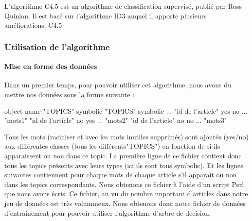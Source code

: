 L’algorithme C4.5 est un algorithme de classification supervisé, publié par Ross Quinlan. Il est basé sur l'algorithme ID3 auquel il apporte plusieurs améliorations.
C4.5




\subsubsection{Utilisation de l'algorithme}
\paragraph{Mise en forme des données}  
Dans un premier temps, pour pouvoir utiliser cet algorithme, nous avons du mettre nos données sous la forme suivante :

object name "TOPICS" symbolic "TOPICS" symbolic ... 
"id de l'article" yes no ... "mots1"
"id de l'article" no yes ... "mots2"
"id de l'article" no no ... "mots3"

Tous les mots (raciniser et avec les mots inutiles supprimés) sont ajoutés (yes/no) aux différentes classes (tous les différents"TOPICS") en fonction de si ils apparaissent ou non dans ce topic.
La première ligne de ce fichier contient donc tous les topics présents avec leurs types (ici ils sont tous symbolic). Et les lignes suivantes contiennent pour chaque mots de chaque article s'il apparait ou non dans les topics correspondants.
Nous obtenons ce fichier à l'aide d'un script Perl que nous avons écris. Ce fichier, au vu du nombre important d'articles dans notre jeu de données est très volumineux. Nous obtenons donc notre fichier de données d'entrainement pour pouvoir utiliser l'algorithme d'arbre de décision. 


